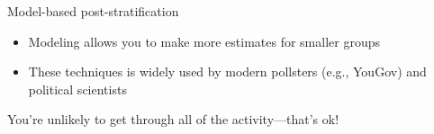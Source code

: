 \documentclass[aspectratio=169]{beamer}
\begin{document}
\begin{frame}{Model-based post-stratification}

\begin{itemize}
\item Modeling allows you to make more estimates for smaller groups \pause
\item These techniques is widely used by modern pollsters (e.g., YouGov) and political scientists \pause
\end{itemize}

\end{frame}
\begin{frame}

\begin{center}
You're unlikely to get through all of the activity---that's ok!
\end{center}

\end{frame}
\end{document}
